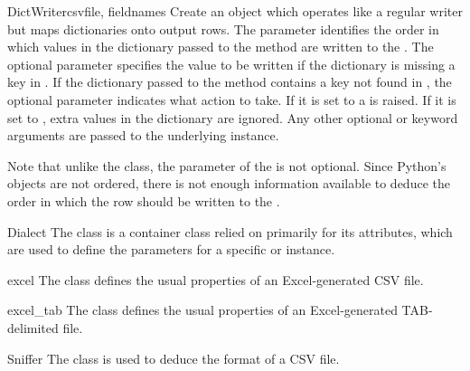 \begin{classdesc}{DictWriter}{csvfile, fieldnames}
Create an object which operates like a regular writer but maps dictionaries
onto output rows.  The  parameter identifies the order in
which values in the dictionary passed to the  method are
written to the .  The optional  parameter
specifies the value to be written if the dictionary is missing a key in
.  If the dictionary passed to the 
method contains a key not found in , the optional
 parameter indicates what action to take.  If it is set
to  a  is raised.  If it is set to
, extra values in the dictionary are ignored.  Any other
optional or keyword arguments are passed to the underlying 
instance.

Note that unlike the  class, the 
parameter of the  is not optional.  Since Python's
 objects are not ordered, there is not enough information
available to deduce the order in which the row should be written to the
.

\end{classdesc}

\begin{classdesc*}{Dialect}{}
The  class is a container class relied on primarily for its
attributes, which are used to define the parameters for a specific
 or  instance.
\end{classdesc*}

\begin{classdesc}{excel}{}
The  class defines the usual properties of an Excel-generated
CSV file.
\end{classdesc}

\begin{classdesc}{excel_tab}{}
The  class defines the usual properties of an
Excel-generated TAB-delimited file.
\end{classdesc}

\begin{classdesc}{Sniffer}{}
The  class is used to deduce the format of a CSV file.
\end{classdesc}


